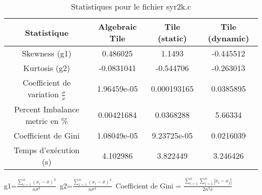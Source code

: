 \documentclass{article}
\begin{document}
\begin{table}[htbp]
  \centering
  \caption{Statistiques pour le fichier syr2k.c}
  \begin{tabular}{|c|c|c|c|}
    \hline
    Statistique & Algebraic Tile & Tile (static) & Tile (dynamic) \\ 
    \hline
    Skewness (g1)  & 0.486025 & 1.1493 & -0.445512 \\ 
    Kurtosis (g2)  & -0.0831041 & -0.544706 & -0.263013 \\ 
    Coefficient de variation $ \frac{\sigma}{\overline{x}} $ & 1.96459e-05 & 0.000193165 & 0.0385895\\ 
    Percent Imbalance metric en \% & 0.00421684 & 0.0368288 & 5.66334\\ 
    Coefficient de Gini  & 1.08049e-05 & 9.23725e-05 & 0.0216039\\ 
    Temps d'exécution (s) &  4.102986    &  3.822449   &  3.246426   \\ 

    \hline
  \end{tabular}
\end{table}\newline
g1=$ \frac{\sum_{i=1}^{n} (x_i - \overline{x})^3}{n\sigma^3} $\
g2=$ \frac{\sum_{i=1}^{n} (x_i - \overline{x})^4}{n\sigma^4} $\
Coefficient de Gini = $ \frac{\sum_{i=1}^{n}\sum_{j=1}^{n} |x_i - x_j|}{2n^2\overline{x}} $\
\newpage
\end{document}
